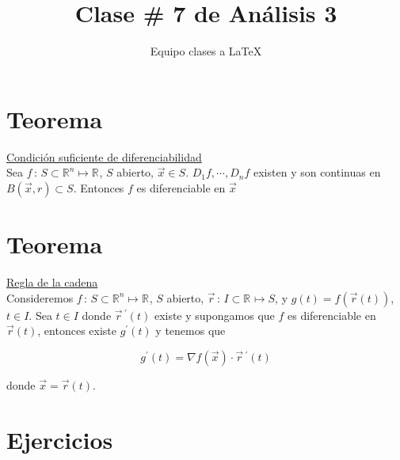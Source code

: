 \documentclass[12pt]{article}
\title{Clase \# 7 de Análisis 3}
\author{Equipo clases a \LaTeX}
\newcommand{\teorema}{\section{Teorema}}
\newcommand{\ejercicios}{\section{Ejercicios}}
\newcommand{\Rn}[1]{\mathbb{R}^{#1}}
\begin{document}
	
	\maketitle
	\tableofcontents
	
	\teorema 
	\underline{Condición suficiente de diferenciabilidad} \\
	
	Sea  $f \, : \, S \subset \Rn{n} \mapsto \Rn{}$, $S$ abierto, $\vec{x} \in S$. $ D_1 f, \cdots, D_n f $ existen y son continuas en $B(\vec{x}, r) \subset S$. Entonces $f$ es diferenciable en $\vec{x}$

	\teorema
	\underline{Regla de la cadena} \\
	
	Consideremos $f \, : \, S \subset \Rn{n} \mapsto \Rn{}$, $S$ abierto, $\vec{r} \, : \, I \subset \Rn{} \mapsto S$, y $g(t) = f(\vec{r}(t))$, $t \in I$. Sea $t \in I$ donde $\vec{r} \, ^{\prime} (t)$ existe y supongamos que $f$ es diferenciable en $\vec{r}(t)$, entonces existe $g^{\prime} (t)$ y tenemos que 
	
	$$ g ^{\prime} (t) = \nabla  f(\vec{x}) \cdot \vec{r}\,^{\prime} (t)$$
	
	donde $\vec{x} = \vec{r} (t)$.
	
    \pagebreak
    

	\ejercicios
	
\end{document}
